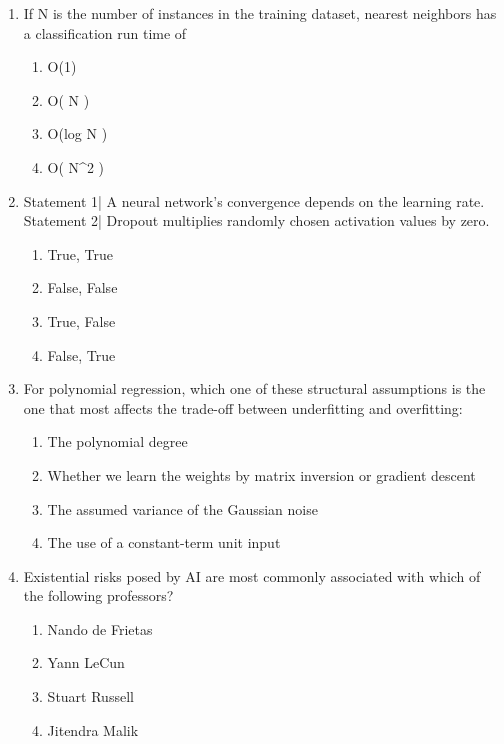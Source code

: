 \documentclass[{\csname fa0013Font0\endcsname\char"0030}{\csname fa0014Font0\endcsname\char"0033}pt]{article}
\begin{document}
\begin{enumerate}[label=\arabic*.]
\begin{enumerate}[label=(\alph*)]
    \item Larger if the error rate is smaller.
    \item Smaller if the error rate is smaller.
    \item It does not matter.
\end{enumerate}
\item If N is the number of instances in the training dataset, nearest neighbors has a classification run time of
\begin{enumerate}[label=(\alph*)]
    \item O(1)
    \item O( N )
    \item O(log N )
    \item O( N\^{}2 )
\end{enumerate}
\item Statement 1| A neural network's convergence depends on the learning rate. Statement 2| Dropout multiplies randomly chosen activation values by zero.
\begin{enumerate}[label=(\alph*)]
    \item True, True
    \item False, False
    \item True, False
    \item False, True
\end{enumerate}
\item For polynomial regression, which one of these structural assumptions is the one that most affects the trade-off between underfitting and overfitting:
\begin{enumerate}[label=(\alph*)]
    \item The polynomial degree
    \item Whether we learn the weights by matrix inversion or gradient descent
    \item The assumed variance of the Gaussian noise
    \item The use of a constant-term unit input
\end{enumerate}
\item Existential risks posed by AI are most commonly associated with which of the following professors?
\begin{enumerate}[label=(\alph*)]
    \item Nando de Frietas
    \item Yann LeCun
    \item Stuart Russell
    \item Jitendra Malik
\end{enumerate}

\end{enumerate}
\end{document}
